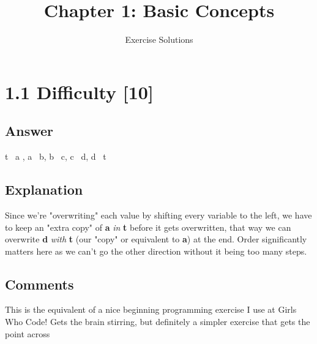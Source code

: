 \documentclass{article}
\title{Chapter 1: Basic Concepts}
\author{Exercise Solutions}
\date{}
\begin{document}
\maketitle

\section*{1.1 Difficulty [10]}

\subsection*{Answer}
t \textleftarrow\ a , a \textleftarrow\ b, b \textleftarrow\ c, 
c \textleftarrow\ d, d \textleftarrow\ t
\subsection*{Explanation}
Since we're "overwriting" each value by shifting every variable to the left, 
we have to keep an "extra copy" of \textbf{a} \textit{in} \textbf{t} before it gets overwritten, that way we can
overwrite \textbf{d} \textit{with} \textbf{t} (our "copy" or equivalent to \textbf{a}) at the end. Order significantly
matters here as we can't go the other direction without it being too many steps.
\subsection*{Comments}
This is the equivalent of a nice beginning programming exercise I use
at Girls Who Code! Gets the brain stirring, but definitely a simpler 
exercise that gets the point across
\end{document}
